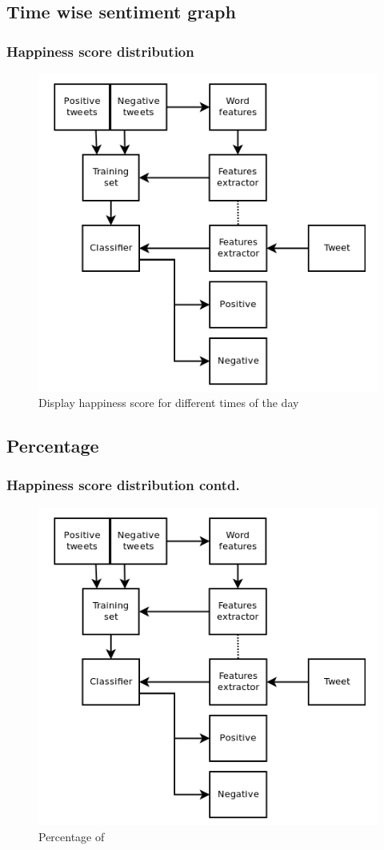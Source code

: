 \documentclass{beamer}
\begin{document}
\subsection{Time wise sentiment graph}
\begin{frame}
\frametitle{Happiness score distribution}
\begin{figure}
\includegraphics[scale=0.35]{./Images/NLTK}
\caption{Display happiness score for different times of the day}
\end{figure}
\end{frame}

\subsection{Percentage}
\begin{frame}
\frametitle{Happiness score distribution contd.}
\begin{figure}
\includegraphics[scale=0.35]{./Images/NLTK}
\caption{Percentage of }
\end{figure}
\end{frame}
\end{document}

